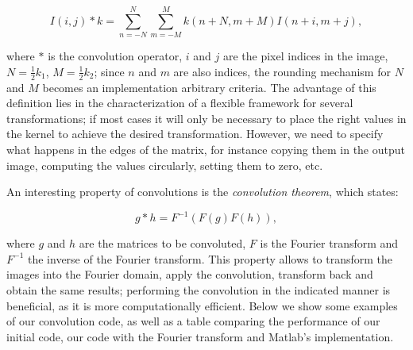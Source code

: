 \documentclass[12pt]{article}
\begin{document}
\begin{equation}
I(i,j) * k = \sum_{n = -N}^N \sum_{m = -M}^M k(n + N, m + M) I(n + i,m + j),
\end{equation}

where $*$ is the convolution operator, $i$ and $j$ are the pixel indices in the image, $N = \frac{1}{2}k_1$, $M = \frac{1}{2}k_2$; since $n$ and $m$ are also indices, the rounding mechanism for $N$ and $M$ becomes an implementation arbitrary criteria. 
The advantage of this definition lies in the characterization of a flexible framework for several transformations; if most cases it will only be necessary to place the right values in the kernel to achieve the desired transformation.
However, we need to specify what happens in the edges of the matrix, for instance copying them in the output image, computing the values circularly, setting them to zero, etc.

An interesting property of convolutions is the \emph{convolution theorem}, which states:

\begin{equation}
g * h = F^{-1} ( F(g)  F(h) ),
\end{equation}

where $g$ and $h$ are the matrices to be convoluted, $F$ is the Fourier transform and $F^{-1}$ the inverse of the Fourier transform.
This property allows to transform the images into the Fourier domain, apply the convolution, transform back and obtain the same results; performing the convolution in the indicated manner is beneficial, as it is more computationally efficient.
Below we show some examples of our convolution code, as well as a table comparing the performance of our initial code, our code with the Fourier transform and Matlab's implementation.
\end{document}
